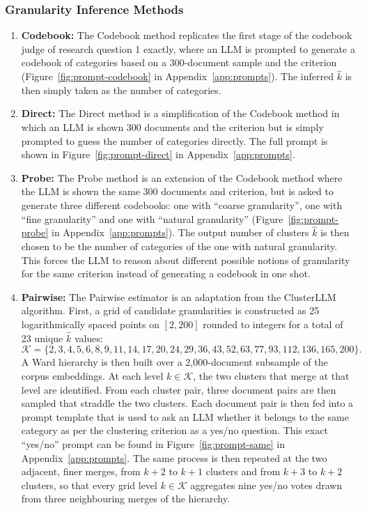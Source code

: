 \documentclass[11pt,a4paper,oneside]{report}
\begin{document}
\subsubsection{Granularity Inference Methods}

\begin{enumerate}
\item \textbf{Codebook:} The Codebook method replicates the first stage of the codebook judge of research question 1 exactly, where an LLM is prompted to generate a codebook of categories based on a 300-document sample and the criterion (Figure~\ref{fig:prompt-codebook} in Appendix~\ref{app:prompts}). The inferred $\hat{k}$ is then simply taken as the number of categories.
\item \textbf{Direct:} The Direct method is a simplification of the Codebook method in which an LLM is shown 300 documents and the criterion but is simply prompted to guess the number of categories directly. The full prompt is shown in Figure~\ref{fig:prompt-direct} in Appendix~\ref{app:prompts}.
\item \textbf{Probe:} The Probe method is an extension of the Codebook method where the LLM is shown the same 300 documents and criterion, but is asked to generate three different codebooks: one with ``coarse granularity'', one with ``fine granularity'' and one with ``natural granularity'' (Figure~\ref{fig:prompt-probe} in Appendix~\ref{app:prompts}). The output number of clusters $\hat{k}$ is then chosen to be the number of categories of the one with natural granularity. This forces the LLM to reason about different possible notions of granularity for the same criterion instead of generating a codebook in one shot.
\item \textbf{Pairwise:} The Pairwise estimator is an adaptation from the ClusterLLM \citep{zhang2023clusterllm} algorithm. First, a grid of candidate granularities is constructed as 25 logarithmically spaced points on $[2, 200]$ rounded to integers for a total of 23 unique $\hat{k}$ values:
\[
\mathcal{K} = \{2, 3, 4, 5, 6, 8, 9, 11, 14, 17, 20, 24, 29, 36, 43, 52, 63, 77, 93, 112, 136, 165, 200\}.
\]
A Ward hierarchy is then built over a 2{,}000-document subsample of the corpus embeddings. At each level $k \in \mathcal{K}$, the two clusters that merge at that level are identified. From each cluster pair, three document pairs are then sampled that straddle the two clusters. Each document pair is then fed into a prompt template that is used to ask an LLM whether it belongs to the same category as per the clustering criterion as a yes/no question. This exact ``yes/no'' prompt can be found in Figure~\ref{fig:prompt-same} in Appendix~\ref{app:prompts}. The same process is then repeated at the two adjacent, finer merges, from $k+2$ to $k+1$ clusters and from $k+3$ to $k+2$ clusters, so that every grid level $k \in \mathcal{K}$ aggregates nine yes/no votes drawn from three neighbouring merges of the hierarchy.


\end{enumerate}
\end{document}
